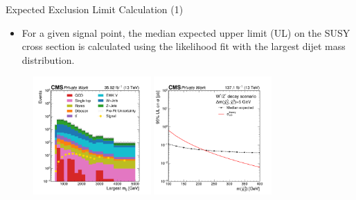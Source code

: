 \begin{frame}[fragile]{Expected Exclusion Limit Calculation (1)}
  \begin{itemize}
    \item For a given signal point, the median expected upper limit (UL) on the SUSY cross section is calculated using the likelihood fit with the largest dijet mass distribution.
  \end{itemize}

   \begin{figure}[htpb]
    \centering
    \includegraphics[width=0.4\textwidth]{fig/sr/SR-mjj-2016.pdf}
    \includegraphics[width=0.4\textwidth]{fig/limit-example/step-1.pdf}
  \end{figure}     
\end{frame}

